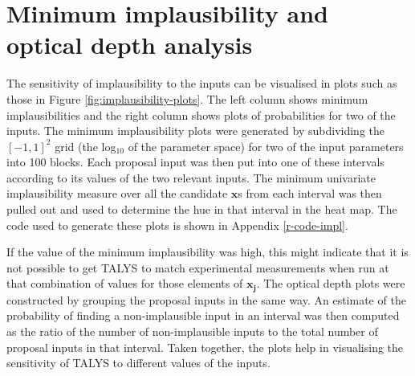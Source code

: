 \documentclass[
  12pt,
  a4paper,
  twoside]{book}
\begin{document}
\hypertarget{impl-optical-depth}{%
\section{Minimum implausibility and optical depth analysis}\label{impl-optical-depth}}

The sensitivity of implausibility to the inputs can be visualised in plots such as those in Figure \ref{fig:implausibility-plots}. The left column shows minimum implausibilities and the right column shows plots of probabilities for two of the inputs. The minimum implausibility plots were generated by subdividing the \([-1,1]^2\) grid (the log\(_{10}\) of the parameter space) for two of the input parameters into 100 blocks. Each proposal input was then put into one of these intervals according to its values of the two relevant inputs. The minimum univariate implausibility measure over all the candidate \(\mathbf{x}\)s from each interval was then pulled out and used to determine the hue in that interval in the heat map. The code used to generate these plots is shown in Appendix \ref{r-code-impl}.

If the value of the minimum implausibility was high, this might indicate that it is not possible to get TALYS to match experimental measurements when run at that combination of values for those elements of \(\mathbf{x_j}\). The optical depth plots were constructed by grouping the proposal inputs in the same way. An estimate of the probability of finding a non-implausible input in an interval was then computed as the ratio of the number of non-implausible inputs to the total number of proposal inputs in that interval. Taken together, the plots help in visualising the sensitivity of TALYS to different values of the inputs.
\end{document}
